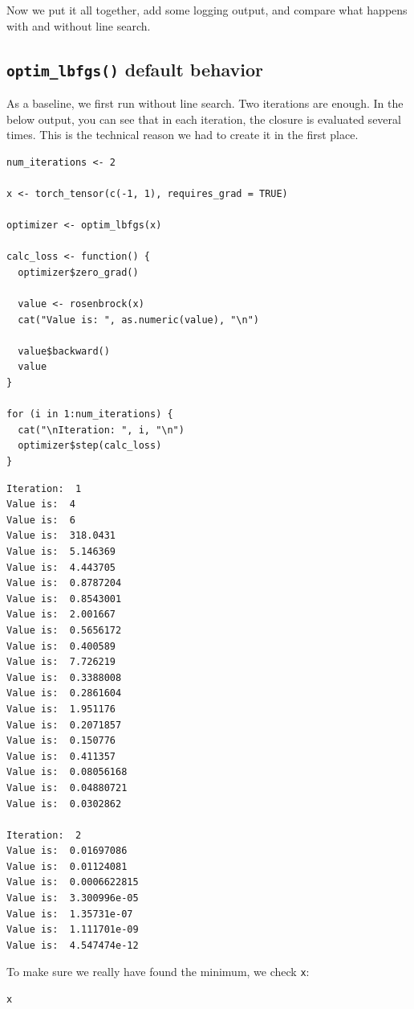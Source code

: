 \documentclass[
  letterpaper,
]{krantz}
\begin{document}
Now we put it all together, add some logging output, and compare what
happens with and without line search.

\hypertarget{optim_lbfgs-default-behavior}{%
\subsection{\texorpdfstring{\texttt{optim\_lbfgs()} default
behavior}{optim\_lbfgs() default behavior}}\label{optim_lbfgs-default-behavior}}

As a baseline, we first run without line search. Two iterations are
enough. In the below output, you can see that in each iteration, the
closure is evaluated several times. This is the technical reason we had
to create it in the first place.

\begin{verbatim}
num_iterations <- 2

x <- torch_tensor(c(-1, 1), requires_grad = TRUE)

optimizer <- optim_lbfgs(x)

calc_loss <- function() {
  optimizer$zero_grad()

  value <- rosenbrock(x)
  cat("Value is: ", as.numeric(value), "\n")

  value$backward()
  value
}

for (i in 1:num_iterations) {
  cat("\nIteration: ", i, "\n")
  optimizer$step(calc_loss)
}
\end{verbatim}

\begin{verbatim}
Iteration:  1 
Value is:  4 
Value is:  6 
Value is:  318.0431 
Value is:  5.146369 
Value is:  4.443705 
Value is:  0.8787204 
Value is:  0.8543001 
Value is:  2.001667 
Value is:  0.5656172 
Value is:  0.400589 
Value is:  7.726219 
Value is:  0.3388008 
Value is:  0.2861604 
Value is:  1.951176 
Value is:  0.2071857 
Value is:  0.150776 
Value is:  0.411357 
Value is:  0.08056168 
Value is:  0.04880721 
Value is:  0.0302862 

Iteration:  2 
Value is:  0.01697086 
Value is:  0.01124081 
Value is:  0.0006622815 
Value is:  3.300996e-05 
Value is:  1.35731e-07 
Value is:  1.111701e-09 
Value is:  4.547474e-12 
\end{verbatim}

To make sure we really have found the minimum, we check \texttt{x}:

\begin{verbatim}
x
\end{verbatim}
\end{document}
